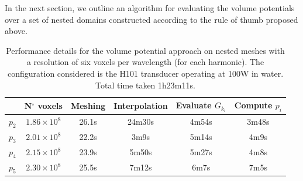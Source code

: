 \documentclass[11pt]{article}
\numberwithin{equation}{section}
\begin{document}
In the next section, we outline an algorithm for evaluating the volume potentials 
over a set of nested domains constructed according to the rule of thumb proposed above.


\begin{table}[ht!]
    \centering
    \begin{tabular}{c  c  c  c  c c}
        \hline\hline
           &  N$^\circ$ voxels & Meshing & Interpolation & Evaluate $G_{k_i}$ & Compute $p_i$\\
        \hline
        $p_2$ & $1.86\times10^8$ & 26.1s & 24m30s & 4m54s & 3m48s \\
        $p_3$ & $2.01\times10^8$ & 22.2s & 3m9s & 5m14s & 4m9s\\
        $p_4$ & $2.15\times10^8$ & 23.9s & 5m50s & 5m27s   & 4m8s   \\
        $p_5$ & $2.30\times10^8$ & 25.5s & 7m12s & 6m7s   & 7m5s \\
        \hline\hline
    \end{tabular}
    \caption{Performance details for the volume potential approach on nested 
    meshes with a resolution of six voxels per wavelength (for each harmonic). 
    The configuration considered is the H101 transducer operating at 100W in water.
    Total time taken 1h23m11s.}
    \label{tab:performance}
\end{table}

\end{document}
